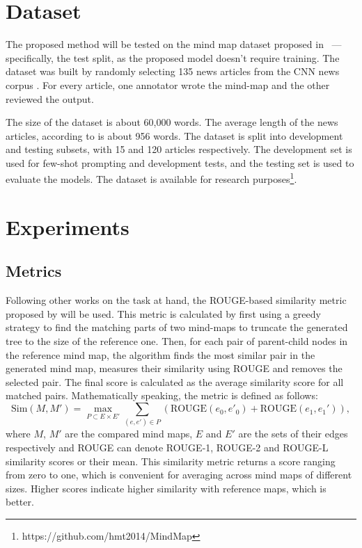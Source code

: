 \documentclass{article}
\begin{document}
\section{Dataset}
\label{sec:dataset}
The proposed method will be tested on the mind map dataset proposed in \cite{wei2019revealing}~--- specifically, the test split, as the proposed model doesn't require training. The dataset was built by randomly selecting 135 news articles from the CNN news corpus \cite{hermann2015teaching}. For every article, one annotator wrote the mind-map and the other reviewed the output. 

The size of the dataset is about 60,000 words. The average length of the news articles, according to \cite{wei2019revealing} is about 956 words. The dataset is split into development and testing subsets, with 15 and 120 articles respectively. The development set is used for few-shot prompting and development tests, and the testing set is used to evaluate the models. The dataset is available for research purposes\footnote{https://github.com/hmt2014/MindMap}.



\section{Experiments}
\subsection{Metrics}
\label{sec:metrics}
Following other works on the task at hand, the ROUGE-based similarity metric proposed by \cite{wei2019revealing} will be used. This metric is calculated by first using a greedy strategy to find the matching parts of two mind-maps to truncate the generated tree to the size of the reference one. Then, for each pair of parent-child nodes in the reference mind map, the algorithm finds the most similar pair in the generated mind map, measures their similarity using ROUGE \cite{lin2004rouge} and removes the selected pair. The final score is calculated as the average similarity score for all matched pairs. Mathematically speaking, the metric is defined as follows:
$$
\text{Sim}(M, M') = \max\limits_{P\subset E\times E'} \sum\limits_{(e, e')\in P}\left(\text{ROUGE}(e_0, e'_0) + \text{ROUGE}(e_1, e_1')\right),
$$
where $M$, $M'$ are the compared mind maps, $E$ and $E'$ are the sets of their edges respectively and ROUGE can denote ROUGE-1, ROUGE-2 and ROUGE-L similarity scores or their mean. This similarity metric returns a score ranging from zero to one, which is convenient for averaging across mind maps of different sizes. Higher scores indicate higher similarity with reference maps, which is better.
\end{document}
